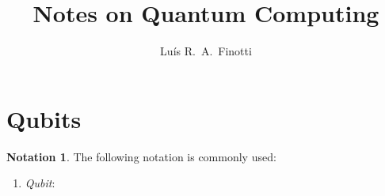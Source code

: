 \documentclass[12pt]{amsart}
\title{Notes on Quantum Computing}
\author{Luís R.~A.~Finotti}
\theoremstyle{plain}
\theoremstyle{definition}
\newtheorem{notation}[theorem]{Notation}
\theoremstyle{remark}
\newcommand{\mi}{\mathrm{i}}
\newcommand{\idef}{\overset{{\rm def}}{=}}
\begin{document}
\maketitle

\tableofcontents

\section{Qubits}

\begin{notation}
  The following notation is commonly used:

  \begin{enumerate}[itemsep=2ex]

  \item{} \emph{Qubit}:
    \begin{align*}
    \end{align*}


\end{enumerate}
\end{notation}
\end{document}
